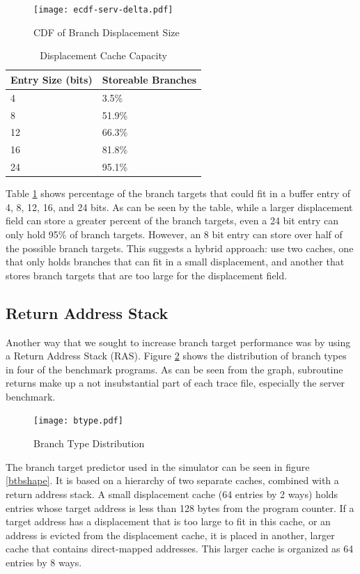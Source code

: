 \documentclass[twocolumn]{article}
\newcommand{\centerimage}[3]{
\begin{figure}[ht!]  
\begin{center}
#1
\caption{#2}
\label{#3}
\end{center}
\end{figure}}
\begin{document}
\centerimage{\texttt{[image: ecdf-serv-delta.pdf]}}{CDF
  of Branch Displacement Size}{ddelta}


\begin{table}\begin{center}\begin{tabular}{ll}

Entry Size (bits) & Storeable Branches \\
\hline
4 & 3.5\% \\
8 & 51.9\% \\
12 & 66.3\% \\
16 & 81.8\% \\
24 & 95.1\% 
\end{tabular}\end{center}
\caption{Displacement Cache Capacity}
\label{dtable}
\end{table}

Table \ref{dtable} shows percentage of the branch targets that could
fit in a buffer entry of 4, 8, 12, 16, and 24 bits. As can be seen by
the table, while a larger displacement field can store a greater
percent of the branch targets, even a 24 bit entry can only hold 95\%
of branch targets. However, an 8 bit entry can store over half of the
possible branch targets. This suggests a hybrid approach:
use two caches, one that only holds branches that can fit in a small
displacement, and another that stores branch targets that are too
large for the displacement field. 

\subsection{Return Address Stack}
Another way that we sought to increase branch target performance was
by using a Return Address Stack (RAS). Figure \ref{btype} shows the
distribution of branch types in four of the benchmark programs. As can
be seen from the graph, subroutine returns make up a not insubstantial
part of each trace file, especially the server benchmark. 

\centerimage{\texttt{[image: btype.pdf]}}{Branch Type Distribution}{btype}

The branch target predictor used in the simulator can be seen in
figure \ref{btbshape}. It is based on a hierarchy of two separate
caches, combined with a return address stack. A small displacement
cache (64 entries by 2 ways) holds entries whose target address is
less than 128 bytes from the program counter. If a target address has
a displacement that is too large to fit in this cache, or an address
is evicted from the displacement cache, it is placed in another,
larger cache that contains direct-mapped addresses. This larger cache
is organized as 64 entries by 8 ways.
\end{document}
